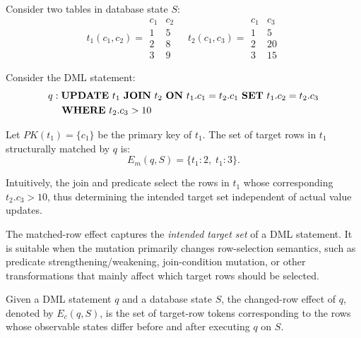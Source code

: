 \begin{example}
	Consider two tables in database state $S$:
	\[
	t_1(c_1, c_2) =
	\begin{array}{c|c}
		c_1 & c_2 \\
		\hline
		1 & 5 \\
		2 & 8 \\
		3 & 9
	\end{array}
	\quad
	t_2(c_1, c_3) =
	\begin{array}{c|c}
		c_1 & c_3 \\
		\hline
		1 & 5 \\
		2 & 20 \\
		3 & 15
	\end{array}
	\]
	
	Consider the DML statement:
	\[
	\begin{aligned}
	q : &\; \text{\textbf{UPDATE} } t_1
	\text{ \textbf{JOIN} } t_2
	\text{ \textbf{ON} } t_1.c_1 = t_2.c_1  
	\text{ \textbf{SET} } t_1.c_2 = t_2.c_3 \\
	&\text{ \textbf{WHERE} } t_2.c_3 > 10
	\end{aligned}
	\]
	
	Let $PK(t_1)=\{c_1\}$ be the primary key of $t_1$.  
	The set of target rows in $t_1$ structurally matched by $q$ is:
	\[
	E_m(q,S)=\{t_1\!:\!2,\; t_1\!:\!3\}.
	\]
	
	Intuitively, the join and predicate select the rows in $t_1$ whose corresponding $t_2.c_3 > 10$, 
	thus determining the intended target set independent of actual value updates.
\end{example}

The matched-row effect captures the \emph{intended target set} of a DML statement. It is suitable when the mutation primarily changes row-selection semantics, such as predicate strengthening/weakening, join-condition mutation, or other transformations that mainly affect which target rows should be selected.

\begin{definition}
	Given a DML statement $q$ and a database state $S$, the changed-row effect of $q$, denoted by $E_c(q,S)$, is the set of target-row tokens corresponding to the rows whose observable states differ before and after executing $q$ on $S$.
\end{definition}

